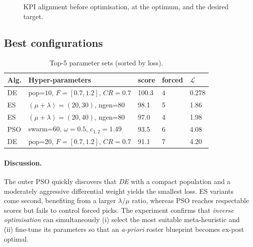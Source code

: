 \documentclass[sigconf]{acmart}
\begin{document}
	\begin{figure}[H]
		\centering
		\caption{KPI alignment before optimisation, at the optimum,
			and the desired target.}
		\label{fig:inv-compare}
	\end{figure}
	
	\subsection{Best configurations}
	\begin{table}[H]
		\centering\small
		\caption{Top-5 parameter sets (sorted by loss).}
		\label{tab:top5}
		\begin{tabular}{@{}lllll@{}}
			\toprule
			\textbf{Alg.} & \textbf{Hyper-parameters} & \textbf{score} &
			\textbf{forced} & $\boldsymbol{\mathcal L}$\\
			\midrule
			DE  & pop=$10$,\; $F=[0.7,1.2]$,\; $CR=0.7$ & 100.3 & 4 & 0.278\\
			ES  & $(\mu+\lambda)=(20,30)$,\; ngen=80     &  98.1 & 5 & 1.86\\
			ES  & $(\mu+\lambda)=(20,40)$,\; ngen=80     &  97.0 & 4 & 1.98\\
			PSO & swarm=$60$,\; $\omega=0.5$,\; $c_{1,2}=1.49$ &  93.5 & 6 & 4.08\\
			DE  & pop=$20$,\; $F=[0.7,1.2]$,\; $CR=0.7$ &  91.1 & 7 & 4.20\\
			\bottomrule
		\end{tabular}
	\end{table}
	
	\paragraph{Discussion.}
	The outer PSO quickly discovers that \emph{DE} with a
	compact population and a moderately aggressive differential weight
	yields the smallest loss.  ES variants come second, benefiting from a
	larger $\lambda/\mu$ ratio, whereas PSO reaches respectable scores but
	fails to control forced picks.  The experiment confirms that
	\emph{inverse optimisation} can simultaneously (i) select the most
	suitable meta-heuristic and (ii) fine-tune its parameters so that an
	\emph{a-priori} roster blueprint becomes ex-post optimal.
	
\end{document}
